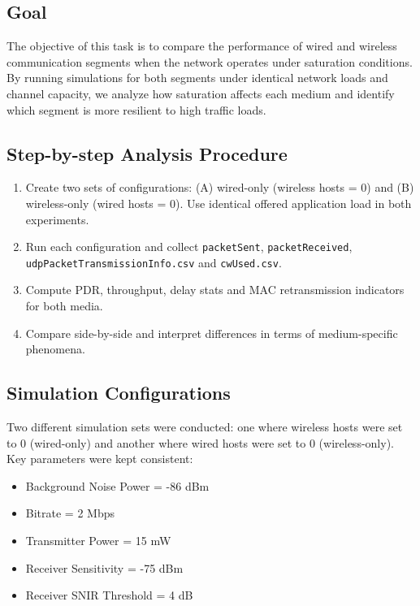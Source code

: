 \documentclass{article}
\begin{document}
\subsection{Goal}

The objective of this task is to compare the performance of wired and wireless communication segments when the network operates under saturation conditions. By running simulations for both segments under identical network loads and channel capacity, we analyze how saturation affects each medium and identify which segment is more resilient to high traffic loads.

\subsection{Step-by-step Analysis Procedure}

\begin{enumerate}

  \item Create two sets of configurations: (A) wired-only (wireless hosts = 0) and (B) wireless-only (wired hosts = 0). Use identical offered application load in both experiments.

  \item Run each configuration and collect \texttt{packetSent}, \texttt{packetReceived}, \texttt{udpPacketTransmissionInfo.csv} and \texttt{cwUsed.csv}.

  \item Compute PDR, throughput, delay stats and MAC retransmission indicators for both media.

  \item Compare side-by-side and interpret differences in terms of medium-specific phenomena.

\end{enumerate}

\subsection{Simulation Configurations}

Two different simulation sets were conducted: one where wireless hosts were set to 0 (wired-only) and another where wired hosts were set to 0 (wireless-only). Key parameters were kept consistent:

\begin{itemize}

    \item Background Noise Power = -86 dBm

    \item Bitrate = 2 Mbps

    \item Transmitter Power = 15 mW

    \item Receiver Sensitivity = -75 dBm

    \item Receiver SNIR Threshold = 4 dB

\end{itemize}
\end{document}
